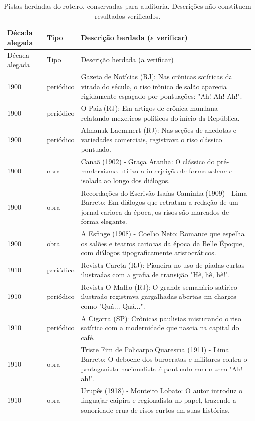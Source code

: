 \small\begin{longtable}{p{}p{}p{}}
\caption{Pistas herdadas do roteiro, conservadas para auditoria. Descrições não constituem resultados verificados.}\\
\toprule Década alegada & Tipo & Descrição herdada (a verificar) \\\midrule\endfirsthead
\toprule Década alegada & Tipo & Descrição herdada (a verificar) \\\midrule\endhead
1900 & periódico & Gazeta de Notícias (RJ): Nas crônicas satíricas da virada do século, o riso irônico de salão aparecia rigidamente espaçado por pontuações: "Ah! Ah! Ah!". \\
1900 & periódico & O Paiz (RJ): Em artigos de crônica mundana relatando mexericos políticos do início da República. \\
1900 & periódico & Almanak Laemmert (RJ): Nas seções de anedotas e variedades comerciais, registrava o riso clássico pontuado. \\
1900 & obra & Canaã (1902) - Graça Aranha: O clássico do pré-modernismo utiliza a interjeição de forma solene e isolada ao longo dos diálogos. \\
1900 & obra & Recordações do Escrivão Isaías Caminha (1909) - Lima Barreto: Em diálogos que retratam a redação de um jornal carioca da época, os risos são marcados de forma elegante. \\
1900 & obra & A Esfinge (1908) - Coelho Neto: Romance que espelha os salões e teatros cariocas da época da Belle Époque, com diálogos tipograficamente aristocráticos. \\
1910 & periódico & Revista Careta (RJ): Pioneira no uso de piadas curtas ilustradas com a grafia de transição "Hê, hê, hê!". \\
1910 & periódico & Revista O Malho (RJ): O grande semanário satírico ilustrado registrava gargalhadas abertas em charges como "Quá... Quá...". \\
1910 & periódico & A Cigarra (SP): Crônicas paulistas misturando o riso satírico com a modernidade que nascia na capital do café. \\
1910 & obra & Triste Fim de Policarpo Quaresma (1911) - Lima Barreto: O deboche dos burocratas e militares contra o protagonista nacionalista é pontuado com o seco "Ah! ah!". \\
1910 & obra & Urupês (1918) - Monteiro Lobato: O autor introduz o linguajar caipira e regionalista no papel, trazendo a sonoridade crua de risos curtos em suas histórias. \\

\end{longtable}

